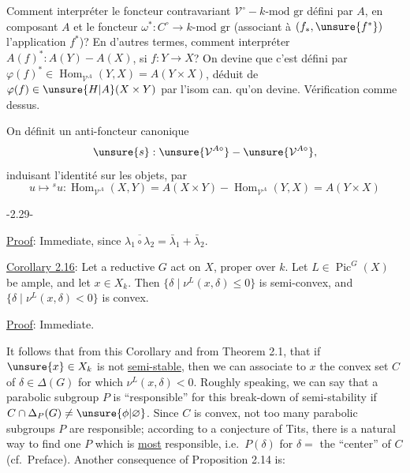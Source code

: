 Comment interpréter le foncteur
contravariant $\mathcal V^\circ-k\text{-mod gr}$ défini par $A$,
en composant $A$ et le foncteur $\omega^*:C^\circ\longrightarrow k\text{-mod gr}$
(associant à $(f_*,\unsure{f^*})$ l'application $f^*$)? En d'autres
termes, comment interpréter $A(f)^*:A(Y)-A(X)$,
si $f:Y\longrightarrow X$? On devine que c'est défini
par $\varphi(f)^*\in\operatorname{Hom}_{\mathcal V^A}(Y,X)=A(Y\times X)$, déduit
de $\varphi(f)\in\unsure{H|A}(X\times Y)$ par l'isom can. qu'on
devine. Vérification comme dessus.

On définit un anti-foncteur canonique
\[
\unsure{s}:\unsure{\mathcal V^{A\circ}}-\unsure{\mathcal V^{A\circ}},
\]
induisant l'identité sur les objets, par
\[
u\longmapsto{}^su:\operatorname{Hom}_{\mathcal V^A}(X,Y)=A(X\times Y)-\operatorname{Hom}_{\mathcal V^A}(Y,X)=A(Y\times X)
\]
\begin{center}-2.29-\end{center}

\uline{Proof}: Immediate, since $\overline{\lambda_1\circ\lambda_2}=\bar\lambda_1+\bar\lambda_2$.

\uline{Corollary 2.16}: Let a reductive $G$ act on $X$, proper over $k$. Let $L\in\operatorname{Pic}^G(X)$ be ample, and let $x\in X_k$. Then $\{\delta\mid\nu^L(x,\delta)\leq0\}$ is semi-convex, and $\{\delta\mid\nu^L(x,\delta)<0\}$ is convex.

\uline{Proof}: Immediate.

It follows that from this Corollary and from Theorem 2.1, that if $\unsure{x}\in X_k$ is not \uline{semi-stable}, then we can associate to $x$ the convex set $C$ of $\delta\in\Delta(G)$ for which $\nu^L(x,\delta)<0$. Roughly speaking, we can say that a parabolic subgroup $P$ is ``responsible'' for this break-down of semi-stability if $C\cap\Delta_P(G)\neq\unsure{\phi|\varnothing}$. Since $C$ is convex, not too many parabolic subgroups $P$ are responsible; according to a conjecture of Tits, there is  a natural way to find one $P$ which is \uline{most} responsible, i.e.\ $P(\delta)$ for $\delta=$ the ``center'' of $C$ (cf.\ Preface).
Another consequence of Proposition 2.14 is:

